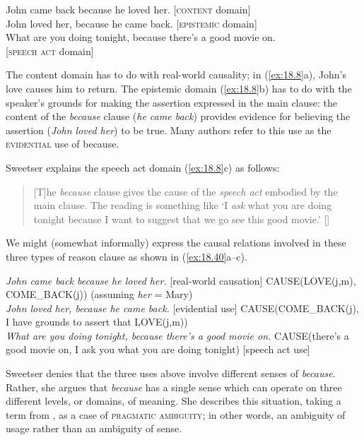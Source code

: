 \ea \label{ex:18.8}
\ea  John came back because he loved her.  \hfill  [\textsc{content} domain]\\
\ex John loved her, because he came back. \hfill   [\textsc{epistemic} domain]\\
\ex What are you doing tonight, because there’s a good movie on. \\
\hfill [\textsc{speech act} domain]
                       \z
\z


The content domain has to do with real-world causality; in (\ref{ex:18.8}a), John’s love causes him to return. The epistemic domain (\ref{ex:18.8}b) has to do with the speaker’s grounds for making the assertion expressed in the main clause: the content of the \textit{because} clause (\textit{he came back}) provides evidence for believing the assertion (\textit{John loved her}) to be true. Many authors refer to this use as the \textsc{evidential} use of because.


Sweetser explains the speech act domain (\ref{ex:18.8}c) as follows:


\begin{quote}
{}[T]he \textit{because} clause gives the cause of the \textit{speech act} embodied by the main clause. The reading is something like ‘I \textit{ask} what you are doing tonight because I want to suggest that we go see this good movie.’ [\citeyear[77]{Sweetser1990}]
\end{quote}


We might (somewhat informally) express the causal relations involved in these three types of reason clause as shown in (\ref{ex:18.40}a–c).


\ea \label{ex:18.40}
\ea  \textit{John came back because he loved her.}  \hfill  [real-world causation]
CAUSE(LOVE(j,m), COME\_BACK(j))  \hfill (assuming \textit{her} = Mary)\\
\ex \textit{John loved her, because he came back.} \hfill   [evidential use] 
CAUSE(COME\_BACK(j), I have grounds to assert that LOVE(j,m))\\
\ex \textit{What are you doing tonight, because there’s a good movie on.}
\newline
CAUSE(there’s a good movie on, I ask you what you are doing tonight) 
\hfill [speech act use]
                       \z
\z


Sweetser denies that the three uses above involve different senses of \textit{because}. Rather, she argues that \textit{because} has a single sense which can operate on three different levels, or domains, of meaning. She describes this situation, taking a term from \citet{Horn1985}, as a case of \textsc{pragmatic ambiguity}; in other words, an ambiguity of usage rather than an ambiguity of sense.



